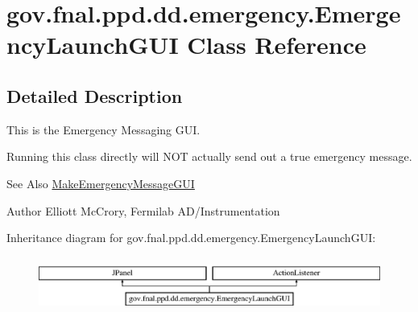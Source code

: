 \hypertarget{classgov_1_1fnal_1_1ppd_1_1dd_1_1emergency_1_1EmergencyLaunchGUI}{\section{gov.\-fnal.\-ppd.\-dd.\-emergency.\-Emergency\-Launch\-G\-U\-I Class Reference}
\label{classgov_1_1fnal_1_1ppd_1_1dd_1_1emergency_1_1EmergencyLaunchGUI}
}


\subsection{Detailed Description}
This is the Emergency Messaging G\-U\-I.

Running this class directly will N\-O\-T actually send out a true emergency message. \begin{DoxySeeAlso}{See Also}
\hyperlink{classgov_1_1fnal_1_1ppd_1_1dd_1_1emergency_1_1MakeEmergencyMessageGUI}{Make\-Emergency\-Message\-G\-U\-I}
\end{DoxySeeAlso}
\begin{DoxyAuthor}{Author}
Elliott Mc\-Crory, Fermilab A\-D/\-Instrumentation 
\end{DoxyAuthor}
Inheritance diagram for gov.\-fnal.\-ppd.\-dd.\-emergency.\-Emergency\-Launch\-G\-U\-I\-:\begin{figure}[H]
\begin{center}
\leavevmode
\includegraphics[height=1.830065cm]{classgov_1_1fnal_1_1ppd_1_1dd_1_1emergency_1_1EmergencyLaunchGUI}
\end{center}
\end{figure}
